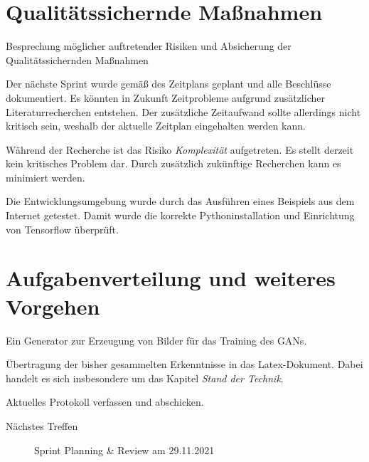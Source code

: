 \section{Qualitätssichernde Maßnahmen}
Besprechung möglicher auftretender Risiken und Absicherung der Qualitätssichernden Maßnahmen
\begin{description}[style=nextline]
	\item[Review und Dokumentation \hfill \fullcheck]
	Der nächste Sprint wurde gemäß des Zeitplans geplant und alle Beschlüsse dokumentiert.
	Es könnten in Zukunft Zeitprobleme aufgrund zusätzlicher Literaturrecherchen entstehen.
	Der zusätzliche Zeitaufwand sollte allerdings nicht kritisch sein, weshalb der aktuelle Zeitplan eingehalten werden kann.
	\item[Risikoanalyse \hfill \fullcheck]
	Während der Recherche ist das Risiko \textit{Komplexität} aufgetreten.
	Es stellt derzeit kein kritisches Problem dar.
	Durch zusätzlich zukünftige Recherchen kann es minimiert werden.
	\item[Tests/Kontrollen \hfill \fullcheck]
	Die Entwicklungsumgebung wurde durch das Ausführen eines Beispiels aus dem Internet getestet.
	Damit wurde die korrekte Pythoninstallation und Einrichtung von Tensorflow überprüft.
	
\end{description}

\section{Aufgabenverteilung und weiteres Vorgehen}
\begin{description}[style=nextline]
	\item[Implementierung Testdatengenerator \todoperson{Jonas, Patrick}] 
	Ein Generator zur Erzeugung von Bilder für das Training des GANs.
	
	\item[Dokumentation \todoperson{Jonas, Patrick}]
	Übertragung der bisher gesammelten Erkenntnisse in das Latex-Dokument.
	Dabei handelt es sich insbesondere um das Kapitel \textit{Stand der Technik}.
	
	\item[Protokoll \todoperson{Jonas}]
	Aktuelles Protokoll verfassen und abschicken.
\end{description}
\begin{description}
	\item[Nächstes Treffen] Sprint Planning \& Review am 29.11.2021
\end{description}

